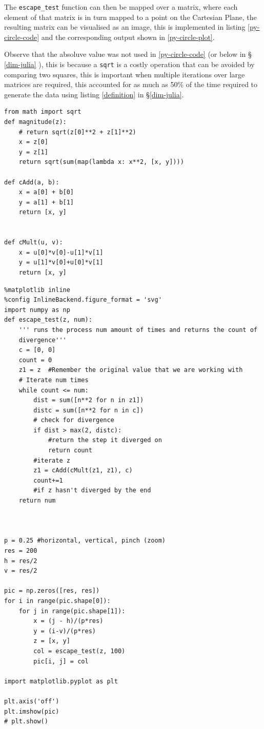 \documentclass[a4paper,11pt,twoside]{article}
\begin{document}
The \texttt{escape\_test} function can then be mapped over a matrix, where each element
of that matrix is in turn mapped to a point on the Cartesian Plane, the resulting matrix
can be visualised as an image, this is implemented in listing
\ref{py-circle-code} and the corresponding output shown in \ref{py-circle-plot}.

Observe that the absoluve value was not used in \ref{py-circle-code} (or below in \S
\ref{dim-julia} ), this is because a \texttt{sqrt} is a costly operation that can be avoided
by comparing two squares, this is important when multiple iterations over large
matrices are required, this accounted for as much as 50\% of the time required to
generate the data using listing \ref{definition} in \S \ref{dim-julia}.



\begin{listing}[htbp]
\begin{verbatim}
from math import sqrt
def magnitude(z):
    # return sqrt(z[0]**2 + z[1]**2)
    x = z[0]
    y = z[1]
    return sqrt(sum(map(lambda x: x**2, [x, y])))

def cAdd(a, b):
    x = a[0] + b[0]
    y = a[1] + b[1]
    return [x, y]


def cMult(u, v):
    x = u[0]*v[0]-u[1]*v[1]
    y = u[1]*v[0]+u[0]*v[1]
    return [x, y]
\end{verbatim}
\caption{\label{complex-vec}Defining Complex Operations with vectors}
\end{listing}

\begin{listing}[htbp]
\begin{verbatim}
%matplotlib inline
%config InlineBackend.figure_format = 'svg'
import numpy as np
def escape_test(z, num):
    ''' runs the process num amount of times and returns the count of
    divergence'''
    c = [0, 0]
    count = 0
    z1 = z  #Remember the original value that we are working with
    # Iterate num times
    while count <= num:
        dist = sum([n**2 for n in z1])
        distc = sum([n**2 for n in c])
        # check for divergence
        if dist > max(2, distc):
            #return the step it diverged on
            return count
        #iterate z
        z1 = cAdd(cMult(z1, z1), c)
        count+=1
        #if z hasn't diverged by the end
    return num



p = 0.25 #horizontal, vertical, pinch (zoom)
res = 200
h = res/2
v = res/2

pic = np.zeros([res, res])
for i in range(pic.shape[0]):
    for j in range(pic.shape[1]):
        x = (j - h)/(p*res)
        y = (i-v)/(p*res)
        z = [x, y]
        col = escape_test(z, 100)
        pic[i, j] = col

import matplotlib.pyplot as plt

plt.axis('off')
plt.imshow(pic)
# plt.show()

\end{verbatim}
\caption{\label{py-circle-code}Circle of Convergence of \(z\) under recursion}
\end{listing}
\end{document}
